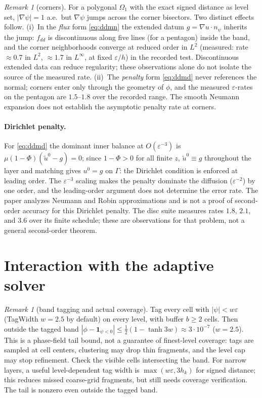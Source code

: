 \documentclass[11pt]{article}
\theoremstyle{remark}
\newtheorem{remark}[theorem]{Remark}
\newcommand{\eps}{\varepsilon}
\begin{document}
\begin{remark}[corners]\label{rem:corners}
For a polygonal $\Omega_1$ with the exact signed distance as level set,
$|\nabla\psi|=1$ a.e.\ but $\nabla\psi$ jumps across the corner
bisectors.  Two distinct effects follow.  (i)~In the \emph{flux} form
\eqref{eq:ddmn} the extended datum $g=\nabla u\cdot n_\psi$ inherits the
jump: $f_{dd}$ is discontinuous along five lines (for a pentagon)
inside the band, and the corner neighborhoods converge at reduced order
in $L^2$ (measured: rate $\approx0.7$ in $L^2$, $\approx1.7$ in
$L^\infty$, at fixed $\eps/h$) in the recorded test. Discontinuous extended data can reduce regularity;
these observations alone do not isolate the source of the measured rate.  (ii)~The \emph{penalty} form
\eqref{eq:ddmd} never references the normal; corners enter only through
the geometry of $\phi$, and the measured $\eps$-rates on the pentagon
are $1.5$--$1.8$ over the recorded range. The smooth Neumann
expansion does not establish the asymptotic penalty rate at corners.
\end{remark}

\paragraph{Dirichlet penalty.}  For \eqref{eq:ddmd} the dominant inner
balance at $O(\eps^{-3})$ is $\mu(1-\Phi)(\tilde u^0-g)=0$; since
$1-\Phi>0$ for all finite $z$, $\tilde u^0\equiv g$ throughout the
layer and matching gives $u^0=g$ on $\Gamma$: the Dirichlet condition
is enforced at leading order.  The $\eps^{-3}$ scaling makes the
penalty dominate the diffusion ($\eps^{-2}$) by one order, and the
leading-order argument does not determine the error rate. The paper
\cite{LervagLowengrub} analyzes Neumann and Robin approximations and is
not a proof of second-order accuracy for this Dirichlet penalty.
The disc suite measures rates $1.8$, $2.1$, and $3.6$ over its finite
schedule; these are observations for that problem, not a general
second-order theorem.

\section{Interaction with the adaptive solver}

\begin{remark}[band tagging and actual coverage]\label{lem:band}
Tag every cell with $|\psi|<w\eps$ (TagWidth $w=2.5$ by default) on
every level, with buffer $b\ge2$ cells.  Then outside the tagged band
$|\phi-\mathbf 1_{\psi<0}|\le\tfrac12(1-\tanh 3w)\approx 3\cdot10^{-7}$
($w=2.5$). This is a phase-field tail bound, not a guarantee of
finest-level coverage: tags are sampled at cell centers, clustering may
drop thin fragments, and the level cap may stop refinement. Check the
visible cells intersecting the band. For narrow layers, a useful
level-dependent tag width is $\max(w\eps,3h_k)$ for signed distance;
this reduces missed coarse-grid fragments, but still needs coverage
verification. The tail is nonzero even outside the tagged band.
\end{remark}
\end{document}
